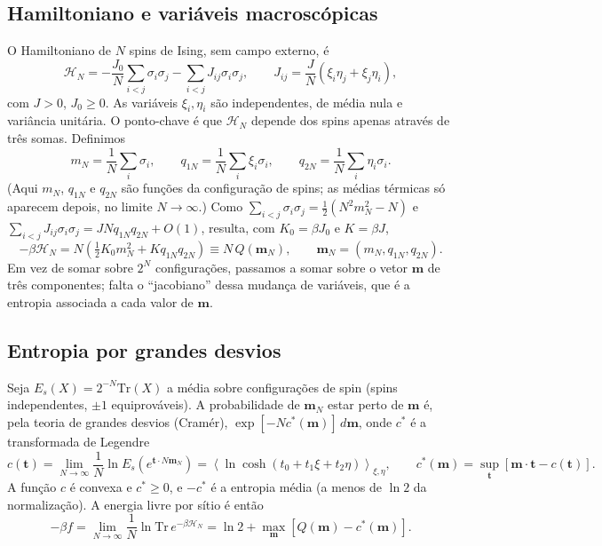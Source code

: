 \documentclass[12pt,a4paper]{article}
\newcommand{\avg}[1]{\left\langle #1\right\rangle}
\begin{document}
\subsection*{Hamiltoniano e variáveis macroscópicas}
O Hamiltoniano de $N$ spins de Ising, sem campo externo, é
%
\begin{equation}
    \mathcal{H}_N
    =
    -\frac{J_0}{N}\sum_{i<j}\sigma_i\sigma_j
    -\sum_{i<j}J_{ij}\sigma_i\sigma_j,
    \qquad
    J_{ij}=\frac{J}{N}\left(\xi_i\eta_j+\xi_j\eta_i\right),
    \label{eq:vh_H}
\end{equation}
%
com $J>0$, $J_0\ge0$. As variáveis $\xi_i,\eta_i$ são independentes, de
média nula e variância unitária. O ponto-chave é que $\mathcal{H}_N$
depende dos spins apenas através de três somas. Definimos
%
\begin{equation}
    m_N=\frac1N\sum_i\sigma_i,\qquad
    q_{1N}=\frac1N\sum_i\xi_i\sigma_i,\qquad
    q_{2N}=\frac1N\sum_i\eta_i\sigma_i .
    \label{eq:vh_vars}
\end{equation}
%
(Aqui $m_N$, $q_{1N}$ e $q_{2N}$ são funções da configuração de spins;
as médias térmicas só aparecem depois, no limite $N\to\infty$.)
Como $\sum_{i<j}\sigma_i\sigma_j=\tfrac12(N^2m_N^2-N)$ e
$\sum_{i<j}J_{ij}\sigma_i\sigma_j=J N q_{1N}q_{2N}+O(1)$, resulta, com
$K_0=\beta J_0$ e $K=\beta J$,
%
\begin{equation}
    -\beta\mathcal{H}_N
    =
    N\left(\tfrac12K_0m_N^2+Kq_{1N}q_{2N}\right)
    \equiv N\,Q(\mathbf{m}_N),
    \qquad
    \mathbf{m}_N=(m_N,q_{1N},q_{2N}).
    \label{eq:vh_Q}
\end{equation}
%
Em vez de somar sobre $2^N$ configurações, passamos a somar sobre o
vetor $\mathbf{m}$ de três componentes; falta o ``jacobiano'' dessa
mudança de variáveis, que é a entropia associada a cada valor de $\mathbf{m}$.

\subsection*{Entropia por grandes desvios}
Seja $E_s(X)=2^{-N}\mathrm{Tr}(X)$ a média sobre configurações de spin
(spins independentes, $\pm1$ equiprováveis). A probabilidade de
$\mathbf{m}_N$ estar perto de $\mathbf{m}$ é, pela teoria de grandes
desvios (Cramér), $\exp[-N c^*(\mathbf{m})]\,d\mathbf{m}$, onde
$c^*$ é a transformada de Legendre
%
\begin{equation}
    c(\mathbf{t})=\lim_{N\to\infty}\frac1N\ln E_s\!\left(e^{\mathbf{t}\cdot N\mathbf{m}_N}\right)
    =\avg{\ln\cosh(t_0+t_1\xi+t_2\eta)}_{\xi,\eta},
    \qquad
    c^*(\mathbf{m})=\sup_{\mathbf{t}}\left[\mathbf{m}\cdot\mathbf{t}-c(\mathbf{t})\right].
    \label{eq:vh_c}
\end{equation}
%
A função $c$ é convexa e $c^*\ge0$, e $-c^*$ é a entropia média (a menos
de $\ln2$ da normalização). A energia livre por sítio é então
%
\begin{equation}
    -\beta f
    =\lim_{N\to\infty}\frac1N\ln\mathrm{Tr}\,e^{-\beta\mathcal{H}_N}
    =\ln2+\max_{\mathbf{m}}\left[Q(\mathbf{m})-c^*(\mathbf{m})\right].
    \label{eq:vh_f_max}
\end{equation}
%
\end{document}
